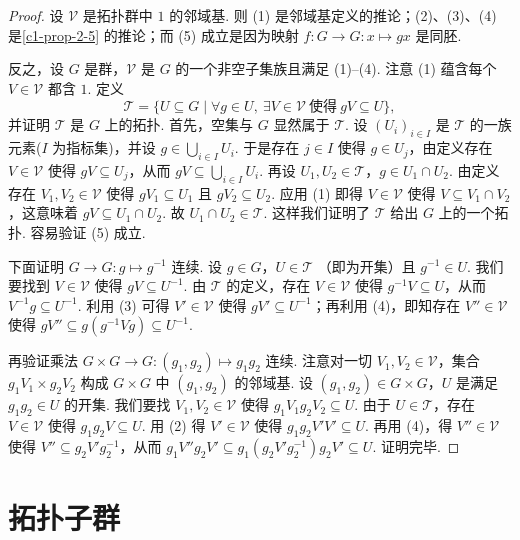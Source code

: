 \begin{proof}
设 $\mathcal{V}$ 是拓扑群中 $1$ 的邻域基. 则 (1) 是邻域基定义的推论；(2)、(3)、(4) 是\autoref{c1-prop-2-5} 的推论；而 (5) 成立是因为映射 $f:G\to G:x\mapsto gx$ 是同胚.

反之，设 $G$ 是群，$\mathcal{V}$ 是 $G$ 的一个非空子集族且满足 (1)--(4). 注意 (1) 蕴含每个 $V\in\mathcal{V}$ 都含 $1$. 定义
\[
\mathcal{T}=\{U\subseteq G\mid \forall g\in U,\ \exists V\in\mathcal{V}\ \text{使得}\ gV\subseteq U\},
\]
并证明 $\mathcal{T}$ 是 $G$ 上的拓扑. 首先，空集与 $G$ 显然属于 $\mathcal{T}$. 设 $(U_i)_{i\in I}$ 是 $\mathcal{T}$ 的一族元素($I$ 为指标集)，并设 $g\in\bigcup_{i\in I}U_i$. 于是存在 $j\in I$ 使得 $g\in U_j$，由定义存在 $V\in\mathcal{V}$ 使得 $gV\subseteq U_j$，从而 $gV\subseteq\bigcup_{i\in I}U_i$. 再设 $U_{1},U_{2}\in\mathcal{T}$，$g\in U_{1}\cap U_{2}$. 由定义存在 $V_{1},V_{2}\in\mathcal{V}$ 使得 $gV_{1}\subseteq U_{1}$ 且 $gV_{2}\subseteq U_{2}$. 应用 (1) 即得 $V\in\mathcal{V}$ 使得 $V\subseteq V_{1}\cap V_{2}$，这意味着 $gV\subseteq U_{1}\cap U_{2}$. 故 $U_{1}\cap U_{2}\in\mathcal{T}$. 这样我们证明了 $\mathcal{T}$ 给出 $G$ 上的一个拓扑. 容易验证 (5) 成立.

下面证明 $G\to G:g\mapsto g^{-1}$ 连续. 设 $g\in G$，$U\in\mathcal{T}$ （即为开集）且 $g^{-1}\in U$. 我们要找到 $V\in\mathcal{V}$ 使得 $gV\subseteq U^{-1}$. 由 $\mathcal{T}$ 的定义，存在 $V\in\mathcal{V}$ 使得 $g^{-1}V\subseteq U$，从而 $V^{-1}g\subseteq U^{-1}$. 利用 (3) 可得 $V'\in\mathcal{V}$ 使得 $gV'\subseteq U^{-1}$；再利用 (4)，即知存在 $V''\in\mathcal{V}$ 使得 $gV''\subseteq g(g^{-1}Vg)\subseteq U^{-1}$.

再验证乘法 $G\times G\to G:(g_{1},g_{2})\mapsto g_{1}g_{2}$ 连续. 注意对一切 $V_{1},V_{2}\in\mathcal{V}$，集合 $g_{1}V_{1}\times g_{2}V_{2}$ 构成 $G\times G$ 中 $(g_{1},g_{2})$ 的邻域基. 设 $(g_{1},g_{2})\in G\times G$，$U$ 是满足 $g_{1}g_{2}\in U$ 的开集. 我们要找 $V_{1},V_{2}\in\mathcal{V}$ 使得 $g_{1}V_{1}g_{2}V_{2}\subseteq U$. 由于 $U\in\mathcal{T}$，存在 $V\in\mathcal{V}$ 使得 $g_{1}g_{2}V\subseteq U$. 用 (2) 得 $V'\in\mathcal{V}$ 使得 $g_{1}g_{2}V'V'\subseteq U$. 再用 (4)，得 $V''\in\mathcal{V}$ 使得 $V''\subseteq g_{2}V'g_{2}^{-1}$，从而 $g_{1}V''g_{2}V'\subseteq g_{1}(g_{2}V'g_{2}^{-1})g_{2}V'\subseteq U$. 证明完毕.
\end{proof}

\section{拓扑子群}

